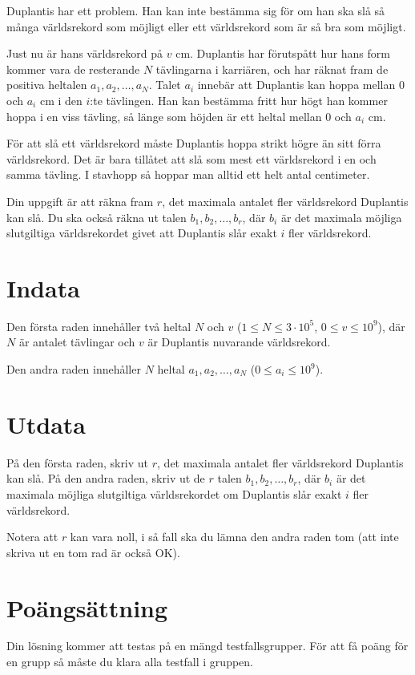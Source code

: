 \noindent

Duplantis har ett problem. Han kan inte bestämma sig för om han ska slå så många världsrekord som möjligt eller ett 
världsrekord som är så bra som möjligt.

Just nu är hans världsrekord på $v$ cm. Duplantis har förutspått hur hans form kommer vara de resterande $N$ tävlingarna 
i karriären, och har räknat fram de positiva heltalen $a_1, a_2, \dots, a_N$. Talet $a_i$ innebär att Duplantis kan 
hoppa mellan $0$ och $a_i$ cm i den $i$:te tävlingen. Han kan bestämma fritt hur högt han kommer hoppa i en viss tävling,
så länge som höjden är ett heltal mellan $0$ och $a_i$ cm.

För att slå ett världsrekord måste Duplantis hoppa strikt högre än sitt förra världsrekord. Det är bara tillåtet att slå som mest 
ett världsrekord i en och samma tävling. I stavhopp så hoppar man alltid ett helt antal centimeter.

Din uppgift är att räkna fram $r$, det maximala antalet fler världsrekord Duplantis kan slå. 
Du ska också räkna ut talen $b_1, b_2, \dots, b_r$, där $b_i$ är det maximala möjliga slutgiltiga världsrekordet 
givet att Duplantis slår exakt $i$ fler världsrekord.

\section*{Indata}
Den första raden innehåller två heltal $N$ och $v$ ($1 \leq N \leq 3 \cdot 10^5$, $0 \leq v \leq 10^9$), där $N$ är antalet tävlingar och $v$ 
är Duplantis nuvarande världsrekord.

Den andra raden innehåller $N$ heltal $a_1, a_2, \dots, a_N$ ($0 \leq a_i \leq 10^9$). 

\section*{Utdata}
På den första raden, skriv ut $r$, det maximala antalet fler världsrekord Duplantis kan slå.
På den andra raden, skriv ut de $r$ talen $b_1, b_2, \dots, b_r$, där $b_i$ är det maximala möjliga slutgiltiga världsrekordet om Duplantis 
slår exakt $i$ fler världsrekord.

Notera att $r$ kan vara noll, i så fall ska du lämna den andra raden tom (att inte skriva ut en tom rad är också OK).

\section*{Poängsättning}
Din lösning kommer att testas på en mängd testfallsgrupper.
För att få poäng för en grupp så måste du klara alla testfall i gruppen.

